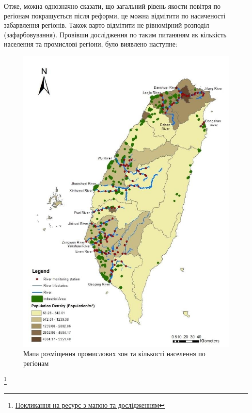 \documentclass{article}
\begin{document}
\begin{enumerate}
    Отже, можна однозначно сказати, що загальний рівень якости повітря по регіонам покращується після реформи, це можна відмітити по насиченості забарвлення регіонів. 
    Також варто відмітити не рівномірний розподіл (зафарбовування). Провівши дослідження по таким питаняням як кількість населення та промислові регіони, було виявлено наступне: 
    \begin{figure}
        \centering
        \includegraphics[width=6in]{notes/media/Study-area-of-Taiwan-representative-rivers-population-density-and-industrial-area-map.png}
        \caption{Мапа розміщення промислових зон та кількості населення по регіонам}
        \label{fig:map_after_reform}
    \end{figure}
    \footnote{\href{https://www.researchgate.net/figure/Study-area-of-Taiwan-representative-rivers-population-density-and-industrial-area-map_fig1_327245998}{Покликання на ресурс з мапою та дослідженням}}
    


\end{enumerate}
\end{document}
